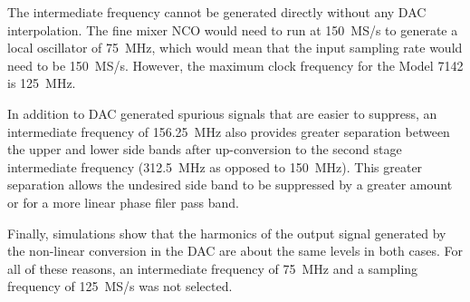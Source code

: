 \documentclass[12pt,letterpaper]{article}
\begin{document}
The intermediate frequency cannot be generated directly without any
DAC interpolation. The fine mixer NCO would need to run at 150~MS/s to
generate a local oscillator of 75~MHz, which would mean that the input
sampling rate would need to be 150~MS/s. However, the maximum clock
frequency for the Model 7142 is 125~MHz.

In addition to DAC generated spurious signals that are easier to
suppress, an intermediate frequency of 156.25~MHz also provides
greater separation between the upper and lower side bands after
up-conversion to the second stage intermediate frequency (312.5~MHz as
opposed to 150~MHz). This greater separation allows the undesired side
band to be suppressed by a greater amount or for a more linear phase
filer pass band.

Finally, simulations show that the harmonics of the output signal
generated by the non-linear conversion in the DAC are about the same
levels in both cases. For all of these reasons, an intermediate
frequency of 75~MHz and a sampling frequency of 125~MS/s was not
selected.



\end{document}
